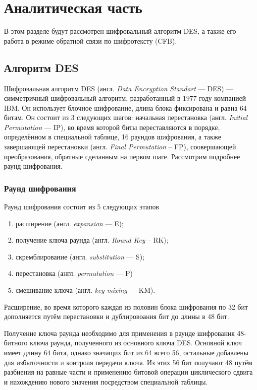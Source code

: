 \chapter{Аналитическая часть}
В этом разделе будут рассмотрен шифровальный алгоритм DES, а также его работа в режиме обратной связи  по шифротексту (CFB).


\section{Алгоритм DES}

Шифровальная алгоритм DES (англ. \textit{Data Encryption Standart} --- DES) --- симметричный шифровальный алгоритм, разработанный в 1977 году компанией IBM. Он использует блочное шифрование, длина блока фиксирована и равна 64 битам. Он состоит из 3 следующих шагов: начальная перестановка (англ. \textit{Initial Permutation} --- IP), во время которой биты переставляются в порядке, определённом в специальной таблице, 16 раундов шифрования, а также завершающей перестановки (англ. \textit{Final Permutation} -- FP), соовершающей преобразования, обратные сделанным на первом шаге. Рассмотрим подробнее раунд шифрования.

\subsection{Раунд шифрования}

Раунд шифрования состоит из 5 следующих этапов
\begin{enumerate}[label=\arabic*)]
	\item расширение (англ. \textit{expansion} --- E);
    \item получение ключа раунда (англ. \textit{Round Key} -- RK);
	\item скремблирование (англ. \textit{substitution} --- S);
	\item перестановка (англ. \textit{permutation} --- P)
	\item смешивание ключа (англ. \textit{key mixing} --- KM).
\end{enumerate}

Расширение, во время которого каждая из половин блока шифрования по 32 бит дополняется путём перестановки и дублировоания бит до длины в 48 бит.

Получение ключа раунда необходимо для применения в раунде шифрования 48-битного ключа раунда, полученного из основного ключа DES. Основной ключ имеет длину 64 бита, однако значащих бит из 64 всего 56, остальные добавлены для избыточности и контроля передачи ключа. Из этих 56 бит получают 48 путём разбиения на равные части и применению битовой операции циклического сдвига и нахождению нового значения посредством специальной таблицы.

